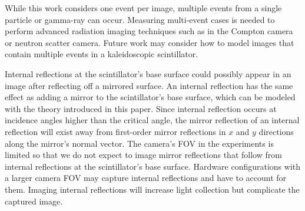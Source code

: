 While this work considers one event per image, multiple events from a single 
particle or gamma-ray can occur. 
Measuring multi-event cases is needed to perform advanced radiation imaging 
techniques such as in the Compton camera or neutron scatter camera.
Future work may consider how to model images that contain multiple events in a 
kaleidoscopic scintillator.

Internal reflections at the scintillator's base surface could possibly 
appear in an image after reflecting off a mirrored surface.
An internal reflection has the same effect as adding a mirror to the 
scintillator's base surface, which can be modeled with the theory introduced in 
this paper.
Since internal reflection occurs at incidence angles higher than the critical 
angle, the mirror reflection of an internal reflection will exist away from 
first-order mirror reflections in $x$ and $y$ directions along the mirror's normal vector.
The camera's FOV in the experiments is limited so that we do not 
expect to image mirror reflections that follow from internal reflections at the 
scintillator's base surface.
Hardware configurations with a larger camera FOV may capture internal reflections 
and have to account for them.
Imaging internal reflections will increase light collection but complicate the 
captured image.


